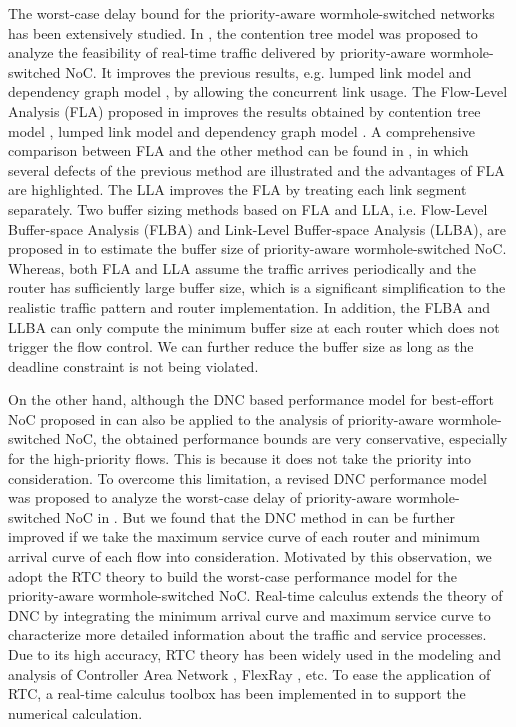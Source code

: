 \documentclass[10pt,journal]{IEEEtran}
\begin{document}
The worst-case delay bound for the priority-aware wormhole-switched networks has been extensively studied. In \cite{LuJS05}, the contention tree model was proposed to analyze the feasibility of real-time traffic delivered by priority-aware wormhole-switched NoC. It improves the previous results, e.g. lumped link model \cite{707545} and dependency graph model \cite{708526}, by allowing the concurrent link usage. The Flow-Level Analysis (FLA) proposed in \cite{Shi:2008:RCA:1397757.1397996} improves the results obtained by contention tree model \cite{LuJS05}, lumped link model \cite{707545} and dependency graph model \cite{708526}. A comprehensive comparison between FLA and the other method can be found in \cite{Shi2009}, in which several defects of the previous method are illustrated and the advantages of FLA are highlighted. The LLA \cite{73} improves the FLA by treating each link segment separately. Two buffer sizing methods based on FLA and LLA, i.e. Flow-Level Buffer-space Analysis (FLBA) and Link-Level Buffer-space Analysis (LLBA), are proposed in \cite{189} to estimate the buffer size of priority-aware wormhole-switched NoC. Whereas, both FLA and LLA assume the traffic arrives periodically and the router has sufficiently large buffer size, which is a significant simplification to the realistic traffic pattern and router implementation. In addition, the FLBA and LLBA can only compute the minimum buffer size at each router which does not trigger the flow control. We can further reduce the buffer size as long as the deadline constraint is not being violated.

On the other hand, although the DNC based performance model for best-effort NoC proposed in \cite{qian2009analysis} can also be applied to the analysis of priority-aware wormhole-switched NoC, the obtained performance bounds are very conservative, especially for the high-priority flows. This is because it does not take the priority into consideration. To overcome this limitation, a revised DNC performance model was proposed to analyze the worst-case delay of priority-aware wormhole-switched NoC in \cite{Qian489900}. But we found that the DNC method in \cite{Qian489900} can be further improved if we take the maximum service curve of each router and minimum arrival curve of each flow into consideration. Motivated by this observation, we adopt the RTC theory \cite{1253607} to build the worst-case performance model for the priority-aware wormhole-switched NoC. Real-time calculus extends the theory of DNC \cite{Boudec2001Network} by integrating the minimum arrival curve and maximum service curve to characterize more detailed information about the traffic and service processes. Due to its high accuracy, RTC theory has been widely used in the modeling and analysis of Controller Area Network \cite{4617308}, FlexRay \cite{Hagiescu:2007:PAF:1278480.1278554}, etc. To ease the application of RTC, a real-time calculus toolbox has been implemented in \cite{rtc} to support the numerical calculation.
\end{document}
